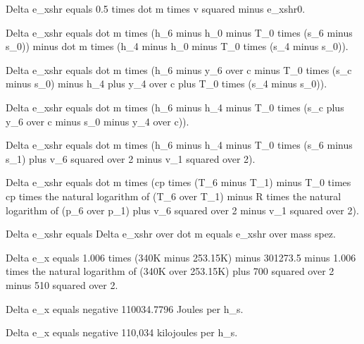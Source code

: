 Delta e_xshr equals 0.5 times dot m times v squared minus e_xshr0.

Delta e_xshr equals dot m times (h_6 minus h_0 minus T_0 times (s_6 minus s_0)) minus dot m times (h_4 minus h_0 minus T_0 times (s_4 minus s_0)).

Delta e_xshr equals dot m times (h_6 minus y_6 over c minus T_0 times (s_c minus s_0) minus h_4 plus y_4 over c plus T_0 times (s_4 minus s_0)).

Delta e_xshr equals dot m times (h_6 minus h_4 minus T_0 times (s_c plus y_6 over c minus s_0 minus y_4 over c)).

Delta e_xshr equals dot m times (h_6 minus h_4 minus T_0 times (s_6 minus s_1) plus v_6 squared over 2 minus v_1 squared over 2).

Delta e_xshr equals dot m times (cp times (T_6 minus T_1) minus T_0 times cp times the natural logarithm of (T_6 over T_1) minus R times the natural logarithm of (p_6 over p_1) plus v_6 squared over 2 minus v_1 squared over 2).

Delta e_xshr equals Delta e_xshr over dot m equals e_xshr over mass spez.

Delta e_x equals 1.006 times (340K minus 253.15K) minus 301273.5 minus 1.006 times the natural logarithm of (340K over 253.15K) plus 700 squared over 2 minus 510 squared over 2.

Delta e_x equals negative 110034.7796 Joules per h_s.

Delta e_x equals negative 110,034 kilojoules per h_s.